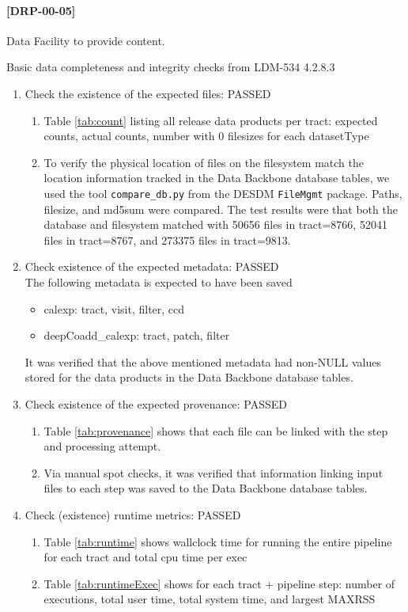 \documentclass[DM,lsstdraft,STR,toc]{lsstdoc}
\begin{document}
\paragraph{[DRP-00-05]}
\begin{note}
Data Facility to provide content.
\end{note}
Basic data completeness and integrity checks from LDM-534 4.2.8.3

\begin{enumerate}
  \item Check the existence of the expected files: PASSED
  \begin{enumerate}
    \item Table \ref{tab:count} listing all release data products per tract:  expected counts, actual counts, number with 0 filesizes for each datasetType
    \item To verify the physical location of files on the filesystem
	  match the location information tracked in the Data Backbone
	  database tables, we used the tool
	  \texttt{compare{\_}db.py} from the DESDM \texttt{FileMgmt}
	  package.  Paths, filesize, and md5sum were compared. The test
	  results were that both the database and filesystem matched with 50656 files in tract=8766, 52041 files in tract=8767, and 273375 files in tract=9813.
  \end{enumerate}
  \item Check existence of the expected metadata: PASSED\\
    The following metadata is expected to have been saved
    \begin{itemize}
    \item calexp: tract, visit, filter, ccd
    \item deepCoadd\_calexp: tract, patch, filter
    \end{itemize}
    It was verified that the above mentioned metadata had non-NULL values stored for the data products in the Data Backbone database tables.
  \item Check existence of the expected provenance: PASSED
  \begin{enumerate}
    \item Table \ref{tab:provenance} shows that each file can be linked with the step and processing attempt.
    \item Via manual spot checks, it was verified that information linking input files to each step was saved to the Data Backbone database tables.
  \end{enumerate}
  \item Check (existence) runtime metrics: PASSED
  \begin{enumerate}
    \item Table \ref{tab:runtime} shows wallclock time for running the entire pipeline for each tract and total cpu time per exec
    \item Table \ref{tab:runtimeExec} shows for each tract + pipeline step:  number of executions, total user time, total system time, and largest MAXRSS
  \end{enumerate}
\end{enumerate}
\end{document}
